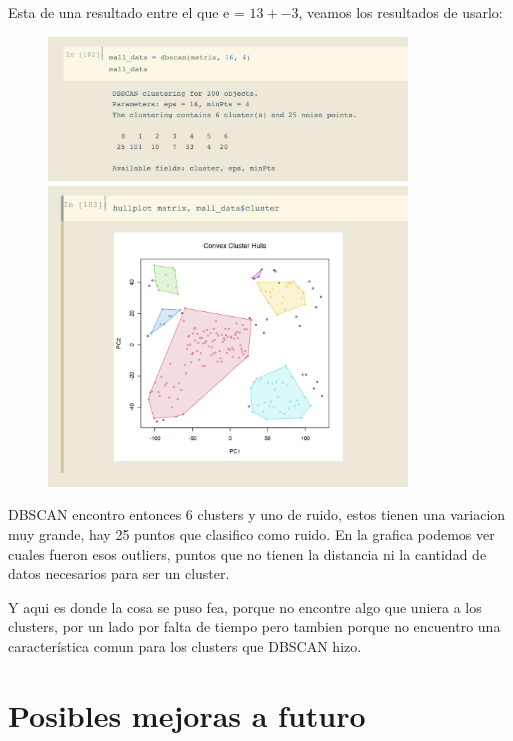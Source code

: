 \documentclass[12pt, fleqn]{report}                             %
\theoremstyle{break}                                            %
\begin{document}
            Esta de una resultado entre el que e = $13 +- 3$, veamos los resultados de usarlo:
            \begin{figure}[ht!]
                \centering
                \includegraphics[width=0.85\textwidth]{d2}
                \includegraphics[width=0.85\textwidth]{d3.png}
            \end{figure}

            DBSCAN encontro entonces 6 clusters y uno de ruido, estos tienen una variacion muy grande, hay 25 puntos que clasifico como ruido.
            En la grafica podemos ver cuales fueron esos outliers, puntos que no tienen la distancia ni la cantidad de datos necesarios para 
            ser un cluster.

            Y aqui es donde la cosa se puso fea, porque no encontre algo que uniera a los clusters, por un lado por falta de tiempo pero
            tambien porque no encuentro una característica comun para los clusters que DBSCAN hizo.


    \section{Posibles mejoras a futuro}
\end{document}
